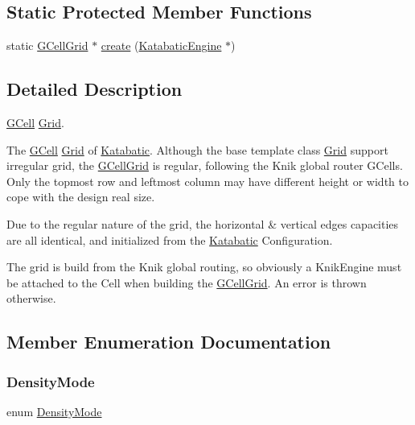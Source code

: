 \subsection*{Static Protected Member Functions}
\begin{DoxyCompactItemize}
\item 
static \mbox{\hyperlink{classKatabatic_1_1GCellGrid}{G\+Cell\+Grid}} $\ast$ \mbox{\hyperlink{classKatabatic_1_1GCellGrid_a19a45b2e6c6b9ca8898b2fde035d1827}{create}} (\mbox{\hyperlink{classKatabatic_1_1KatabaticEngine}{Katabatic\+Engine}} $\ast$)
\end{DoxyCompactItemize}


\subsection{Detailed Description}
\mbox{\hyperlink{classKatabatic_1_1GCell}{G\+Cell}} \mbox{\hyperlink{classKatabatic_1_1Grid}{Grid}}. 

The \mbox{\hyperlink{classKatabatic_1_1GCell}{G\+Cell}} \mbox{\hyperlink{classKatabatic_1_1Grid}{Grid}} of \mbox{\hyperlink{namespaceKatabatic}{Katabatic}}. Although the base template class \mbox{\hyperlink{classKatabatic_1_1Grid}{Grid}} support irregular grid, the \mbox{\hyperlink{classKatabatic_1_1GCellGrid}{G\+Cell\+Grid}} is regular, following the Knik global router G\+Cells. Only the topmost row and leftmost column may have different height or width to cope with the design real size.

Due to the regular nature of the grid, the horizontal \& vertical edges capacities are all identical, and initialized from the \mbox{\hyperlink{namespaceKatabatic}{Katabatic}} Configuration.

The grid is build from the Knik global routing, so obviously a Knik\+Engine must be attached to the Cell when building the \mbox{\hyperlink{classKatabatic_1_1GCellGrid}{G\+Cell\+Grid}}. An error is thrown otherwise. 

\subsection{Member Enumeration Documentation}
\mbox{\label{classKatabatic_1_1GCellGrid_a07884f5e1af410e98208fed76a2b40fe}} 
\subsubsection{\texorpdfstring{Density\+Mode}{DensityMode}}
{\footnotesize\ttfamily enum \mbox{\hyperlink{classKatabatic_1_1GCellGrid_a07884f5e1af410e98208fed76a2b40fe}{Density\+Mode}}}

